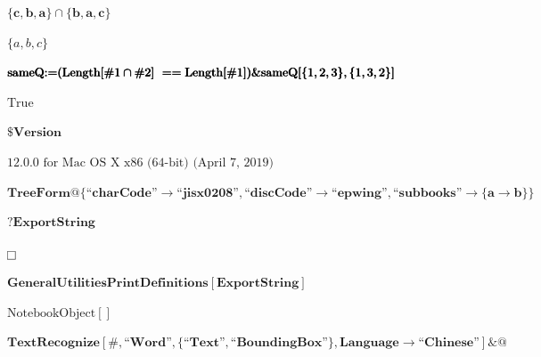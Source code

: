 \documentclass{article}
\begin{document}
\begin{doublespace}
\noindent\(\pmb{\{c,b,a\}\cap \{b,a,c\} }\)
\end{doublespace}

\begin{doublespace}
\noindent\(\{a,b,c\}\)
\end{doublespace}

\begin{doublespace}
\noindent\(\pmb{\text{sameQ} \text{:=}(\text{Length}[\text{$\#$1} \cap  \text{$\#$2}]\text{  }== \text{Length}[ \text{$\#$1}])\&}\\
\pmb{\text{sameQ}[\{1,2,3\}, \{1,3,2\}]}\)
\end{doublespace}

\begin{doublespace}
\noindent\(\text{True}\)
\end{doublespace}

\begin{doublespace}
\noindent\(\pmb{\text{$\$$Version}}\)
\end{doublespace}

\begin{doublespace}
\noindent\(\text{12.0.0 for Mac OS X x86 (64-bit) (April 7, 2019)}\)
\end{doublespace}

\begin{doublespace}
\noindent\(\pmb{\text{TreeForm}@\{\text{{``}charCode{''}}\to \text{{``}jisx0208{''}},\text{{``}discCode{''}}\to \text{{``}epwing{''}},\text{{``}subbooks{''}}\to
\{\text{a}\to \text{b}\}\}}\)
\end{doublespace}

\begin{doublespace}
\noindent\(\pmb{?\text{ExportString}}\)
\end{doublespace}

\begin{doublespace}
\noindent\(\fbox{$$}\)
\end{doublespace}

\begin{doublespace}
\noindent\(\pmb{\text{GeneralUtilities$\grave{ }$PrintDefinitions}[\text{ExportString}]}\)
\end{doublespace}

\begin{doublespace}
\noindent\(\text{NotebookObject}\left[\right]\)
\end{doublespace}

\begin{doublespace}
\noindent\(\pmb{\text{TextRecognize}[\#,\text{{``}Word{''}},\{\text{{``}Text{''}}, \text{{``}BoundingBox{''}}\}, \text{Language}\to \text{{``}Chinese{''}}
]\& @ }\)
\end{doublespace}
\end{document}
